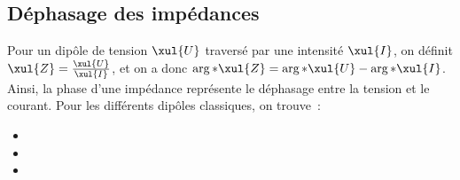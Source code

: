 \documentclass[../../main/main.tex]{subfiles}
\begin{document}
\subsection{Déphasage des impédances}
Pour un dipôle de tension $\xul{U}$ traversé par une intensité $\xul{I}$, on
définit $\xul{Z} = \frac{\xul{U}}{\xul{I}}$, et on a donc $\arg*{\xul{Z}} =
	\arg*{\xul{U}} - \arg*{\xul{I}}$. Ainsi, la phase d'une impédance représente le
déphasage entre la tension et le courant. Pour les différents dipôles
classiques, on trouve~:
\begin{itemize}
	\item {}
	\item {}
	\item {}
	      \vspace{-15pt}
\end{itemize}
\end{document}
